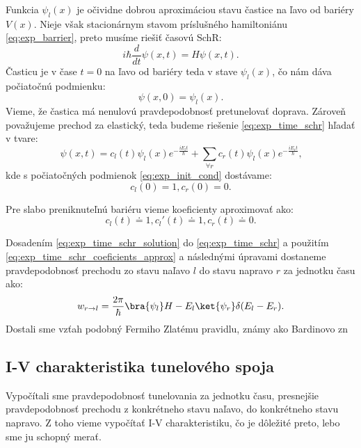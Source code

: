 Funkcia $\psi_l(x)$ je očividne dobrou aproximáciou stavu častice na ľavo od bariéry $V(x)$. Nieje však stacionárnym stavom príslušného hamiltoniánu \eqref{eq:exp_barrier}, preto musíme riešiť časovú SchR:
\begin{equation}
 \label{eq:exp_time_schr}
 i\hbar \frac{d}{dt}\psi(x,t)=\hat{H} \psi(x,t)\text{.}
\end{equation} 
Časticu je v čase $t=0$ na ľavo od bariéry teda v stave $\psi_l(x)$, čo nám dáva počiatočnú podmienku:
\begin{equation}
 \label{eq:exp_init_cond} 
 \psi(x,0)=\psi_l(x)\text{.}
\end{equation} 
Vieme, že častica má nenulovú pravdepodobnosť pretunelovať doprava. Zároveň považujeme prechod za elastický, teda budeme riešenie 
\eqref{eq:exp_time_schr} hľadať v tvare:
\begin{equation}
 \label{eq:exp_time_schr_solution}
 \psi(x,t)=c_l(t)\psi_l(x)e^{-\frac{iE_l t}{\hbar}}+\sum_{\forall r} c_r(t)\psi_l(x)e^{-\frac{iE_r t}{\hbar}}\text{,}
\end{equation} 
kde s počiatočných podmienok \eqref{eq:exp_init_cond} dostávame:
\begin{equation}
 \label{eq:exp_time_schr_coeficients} 
c_l(0)=1 , c_r(0)=0 \text{.}
 \end{equation} 
 
Pre slabo preniknuteľnú bariéru vieme koeficienty aproximovať ako:
 \begin{equation}
 \label{eq:exp_time_schr_coeficients_approx} 
c_l(t)\doteq1,c_l'(t)\doteq1 , c_r(t)\doteq0 \text{.}
 \end{equation} 
 
Dosadením \eqref{eq:exp_time_schr_solution}  do \eqref{eq:exp_time_schr} a použitím \eqref{eq:exp_time_schr_coeficients_approx} 
a následnými úpravami dostaneme pravdepodobnosť prechodu zo stavu naľavo $l$ do stavu napravo $r$ za jednotku času ako:
\begin{equation}
 \label{eq:exp_golden_rule}
 w_{r\to l}=\frac{2\pi}{\hbar} \bra{\psi_l}H-E_l\ket{\psi_r}\delta(E_l-E_r)\text{.}
\end{equation} 
Dostali sme vzťah podobný Fermiho Zlatému pravidlu, známy ako Bardinovo zn
\subsection{I-V charakteristika tunelového spoja}
Vypočítali sme pravdepodobnosť tunelovania za jednotku času, presnejšie pravdepodobnosť prechodu z konkrétneho stavu naľavo, do konkrétneho
stavu napravo. Z toho vieme vypočítať I-V charakteristiku, čo je dôležité preto, lebo sme ju schopný merať.

